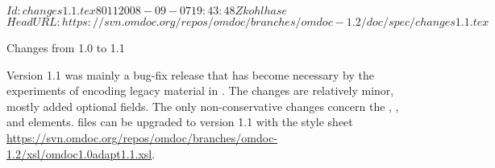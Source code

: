 \svnInfo $Id: changes1.1.tex 8011 2008-09-07 19:43:48Z kohlhase $
\svnKeyword $HeadURL: https://svn.omdoc.org/repos/omdoc/branches/omdoc-1.2/doc/spec/changes1.1.tex $

\begin{tsection}[id=changes1.1]{Changes from 1.0 to 1.1}
  
  Version 1.1 was mainly a bug-fix release that has become necessary by the experiments of
  encoding legacy material in {\omdoc}. The changes are relatively minor, mostly added
  optional fields. The only non-conservative changes concern the {},
  {}, {} and {} elements.
  {\omdoc} files can be upgraded to version 1.1 with the {\xslt} style sheet
  \url{https://svn.omdoc.org/repos/omdoc/branches/omdoc-1.2/xsl/omdoc1.0adapt1.1.xsl}.


\end{tsection}
